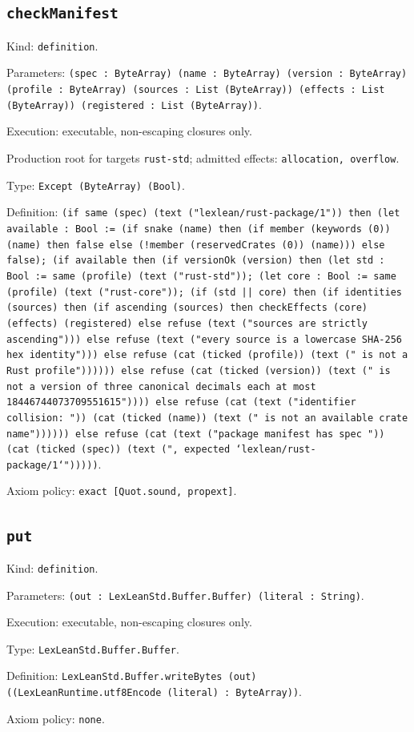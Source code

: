 \documentclass[11pt]{article}
\begin{document}
\subsection*{\texttt{checkManifest}}
\noindent Kind: \texttt{definition}.\par
\noindent Parameters: \texttt{(spec : ByteArray) (name : ByteArray) (version : ByteArray) (profile : ByteArray) (sources : List (ByteArray)) (effects : List (ByteArray)) (registered : List (ByteArray))}.\par
\noindent Execution: executable, non-escaping closures only.\par
\noindent Production root for targets \texttt{rust-std}; admitted effects: \texttt{allocation, overflow}.\par
\noindent Type: \texttt{Except (ByteArray) (Bool)}.\par
\noindent Definition: \texttt{(if same (spec) (text ("lexlean/rust-package/1")) then (let available : Bool := (if snake (name) then (if member (keywords (0)) (name) then false else (!member (reservedCrates (0)) (name))) else false); (if available then (if versionOk (version) then (let std : Bool := same (profile) (text ("rust-std")); (let core : Bool := same (profile) (text ("rust-core")); (if (std || core) then (if identities (sources) then (if ascending (sources) then checkEffects (core) (effects) (registered) else refuse (text ("sources are strictly ascending"))) else refuse (text ("every source is a lowercase SHA-256 hex identity"))) else refuse (cat (ticked (profile)) (text (" is not a Rust profile")))))) else refuse (cat (ticked (version)) (text (" is not a version of three canonical decimals each at most 18446744073709551615")))) else refuse (cat (text ("identifier collision: ")) (cat (ticked (name)) (text (" is not an available crate name")))))) else refuse (cat (text ("package manifest has spec ")) (cat (ticked (spec)) (text (", expected `lexlean/rust-package/1`")))))}.\par
\noindent Axiom policy: \texttt{exact [Quot.sound, propext]}.\par
\subsection*{\texttt{put}}
\noindent Kind: \texttt{definition}.\par
\noindent Parameters: \texttt{(out : LexLeanStd.Buffer.Buffer) (literal : String)}.\par
\noindent Execution: executable, non-escaping closures only.\par
\noindent Type: \texttt{LexLeanStd.Buffer.Buffer}.\par
\noindent Definition: \texttt{LexLeanStd.Buffer.writeBytes (out) ((LexLeanRuntime.utf8Encode (literal) : ByteArray))}.\par
\noindent Axiom policy: \texttt{none}.\par
\end{document}
